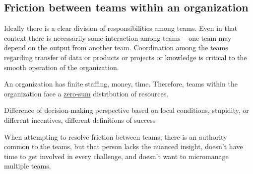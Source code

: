 \subsection*{Friction between teams within an organization}

Ideally there is a clear division of responsibilities among teams. Even in that context there is necessarily some interaction among teams -- one team may depend on the output from another team. Coordination among the teams regarding transfer of data or products or projects or knowledge is critical to the smooth operation of the organization. 

An organization has finite staffing, money, time. Therefore, teams within the organization face a \href{https://en.wikipedia.org/wiki/Zero-sum_game}{zero-sum}
distribution of resources.

Difference of decision-making perspective based on local conditions, stupidity, or different incentives, different definitions of success

When attempting to resolve friction between teams, there is an authority common to the teams, but that person lacks the nuanced insight, doesn't have time to get involved in every challenge, and doesn't want to micromanage multiple teams.